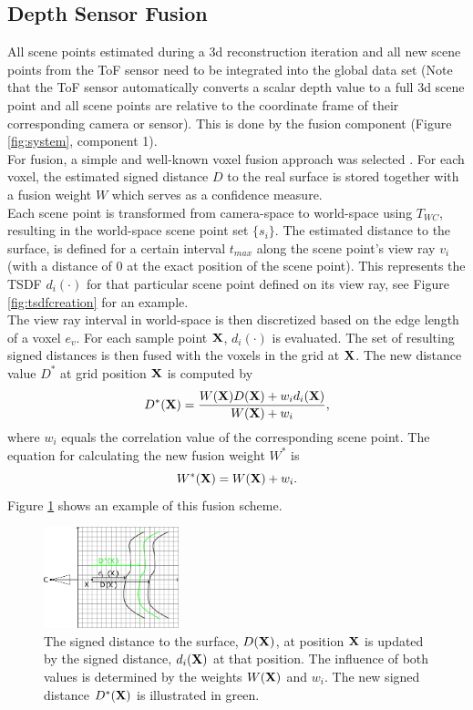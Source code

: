 \documentclass[conference]{IEEEtran}
\newcommand{\sco}[1]{\uppercase{\mathbf{#1}}}
\begin{document}
\subsection {Depth Sensor Fusion}
\label{ch:fusion}
All scene points estimated during a 3d reconstruction iteration and all new scene points from the ToF sensor need to be integrated into the global data set (Note that the ToF sensor automatically converts a scalar depth value to a full 3d scene point and all scene points are relative to the coordinate frame of their corresponding camera or sensor). 
This is done by the fusion component (Figure \ref{fig:system}, component 1).
\\
For fusion, a simple and well-known voxel fusion approach was selected \cite{Curless1996}.
For each voxel, the estimated signed distance $D$ to the real surface is stored together with a fusion weight $W$ which serves as a confidence measure.   
\\
Each scene point is transformed from camera-space to world-space using $T_{WC}$, resulting in the world-space scene point set $\{s_i\}$. 
The estimated distance to the surface, is defined for a certain interval $t_{max}$ along the scene point's view ray $v_i$ (with a distance of $0$ at the exact position of the scene point).
This represents the TSDF $d_i(\cdot)$ for that particular scene point defined on its view ray, see Figure \ref{fig:tsdfcreation} for an example. 
\\
The view ray interval in world-space is then discretized based on the edge length of a voxel $e_v$. 
For each sample point $\sco{x}$, $d_i(\cdot)$ is evaluated.
The set of resulting signed distances is then fused with the voxels in the grid at $\sco{x}$. 
The new distance value $D^{*}$ at grid position $\sco{x}$ is computed by
\begin{equation}
\label{eq:levoy1}
D^{*}(\sco{x}) = \frac{W(\sco{x})D(\sco{x})+w_{i}d_{i}(\sco{x})}{W(\sco{x})+w_{i}},
\end{equation}
where $w_{i}$ equals the correlation value of the corresponding scene point.
The equation for calculating the new fusion weight $W^{*}$ is 
\begin{equation}
\label{eq:levoy2}
W^{*}(\sco{x}) = W(\sco{x}) + w_{i}.
\end{equation}
Figure \ref{fig:levoyfusion} shows an example of this fusion scheme.
\begin{figure}[!htbp]
	\centering
	\includegraphics[width=0.35\textwidth]{figures/tsdf1}
	\caption{
		The signed distance to the surface, $D(\sco{x})$, at position $\sco{x}$ is updated by the signed distance, $d_{i}(\sco{x})$ at that position.
		The influence of both values is determined by the weights $W(\sco{x})$ and $w_{i}$.
		The new signed distance $D^{*}(\sco{x})$ is illustrated in green.
	}
	\label{fig:levoyfusion}
\end{figure}
\end{document}
